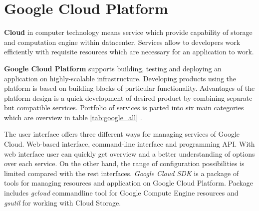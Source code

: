 \documentclass[a4paper,12pt,oneside]{report}
\begin{document}
	
	
	
	\section{Google Cloud Platform}
	\textbf{Cloud} in computer technology means service which provide capability of
	storage and computation engine within datacenter. Services allow to developers 
	work efficiently  with 
	requisite resources which are necessary for an application to work.
	
	\textbf{Google Cloud Platform} supports building, testing and deploying an
	application on highly-scalable infrastructure.
	Developing products using the platform is based on building blocks of particular
	functionality. Advantages of  the platform design is a quick development of 
	desired product by combining separate but compatible services. Portfolio of
	services is parted into six main categories 
	which are overview  in
	table \ref{tab:google_all} \cite{gc_product_services}.
	
	The user interface offers three different ways for managing services of Google
	Cloud. Web-based interface, command-line 
	interface and programming API. With web interface 
	user can quickly get overview and a better understanding of 
	options over each service. On the other hand, the range of configuration
	possibilities is limited compared with the rest 
	interfaces. \textit{Google Cloud SDK} is a 
	package of tools for managing resources and application on Google Cloud
	Platform. 
	Package includes \textit{gcloud} commandline tool for Google Compute Engine
	resources and \textit{gsutil} for working with Cloud Storage.
	
\end{document}
